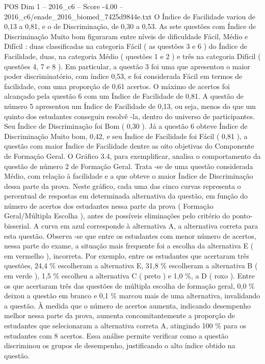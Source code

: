 \begin{textsample}{POS Dim 1 – 2016\_c6 – Score -4.00 – 2016\_c6/enade\_2016\_biomed\_7425d9844e.txt}
O Índice de Facilidade variou de 0,13 a 0,81, e o de Discriminação, de 0,30 a 0,53.
As sete questões com Índice de Discriminação Muito bom figuraram entre níveis de dificuldade Fácil, Médio e Difícil : duas classificadas na categoria Fácil ( as questões 3 e 6 ) do Índice de Facilidade, duas, na categoria Médio ( questões 1 e 2 ) e três na categoria Difícil ( questões 4, 7 e 8 ).
Em particular, a questão 3 foi uma que apresentou o maior poder discriminatório, com índice 0,53, e foi considerada Fácil em termos de facilidade, com uma proporção de 0,61 acertos.
O máximo de acertos foi alcançado pela questão 6 com um Índice de Facilidade de 0,81.
A questão de número 5 apresentou um Índice de Facilidade de 0,13, ou seja, menos do que um quinto dos estudantes conseguiu resolvê -la, dentro do universo de participantes.
Seu Índice de Discriminação foi Bom ( 0,30 ).
Já a questão 6 obteve Índice de Discriminação Muito bom, 0,42, e seu Índice de Facilidade foi Fácil ( 0,81 ), a questão com maior Índice de Facilidade dentre as oito objetivas do Componente de Formação Geral.
O Gráfico 3.4, para exemplificar, analisa o comportamento da questão de número 2 de Formação Geral.
Trata -se de uma questão considerada Médio, com relação à facilidade e a que obteve o maior Índice de Discriminação dessa parte da prova.
Neste gráfico, cada uma das cinco curvas representa o percentual de respostas em determinada alternativa da questão, em função do número de acertos dos estudantes nessa parte da prova ( Formação Geral/Múltipla Escolha ), antes de possíveis eliminações pelo critério do ponto-bisserial.
A curva em azul corresponde à alternativa A, a alternativa correta para esta questão.
Observa -se que entre os estudantes com menor número de acertos, nessa parte do exame, a situação mais frequente foi a escolha da alternativa E ( em vermelho ), incorreta.
Por exemplo, entre os estudantes que acertaram três questões, 24,4 \% escolheram a alternativa E, 31,8 \% escolheram a alternativa B ( em verde ), 1,5 \% escolheu a alternativa C ( preto ) e 1,0 \%, a D ( roxo ).
Entre os que acertaram três das questões de múltipla escolha de formação geral, 0,0 \% deixou a questão em branco e 0,1 \% marcou mais de uma alternativa, invalidando a questão.
À medida que o número de acertos aumenta, indicando desempenho melhor nessa parte da prova, aumenta concomitantemente a proporção de estudantes que selecionaram a alternativa correta A, atingindo 100 \% para os estudantes com 8 acertos.
Essa análise permite verificar como a questão discriminou os grupos de desempenho, justificando o alto índice obtido na questão.

\end{textsample}
